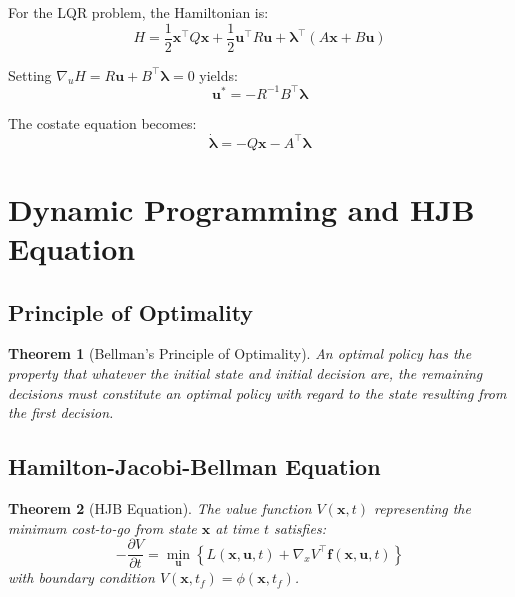 \documentclass[a4paper, 11pt]{article}
\newtheorem{theorem}{Theorem}[section]
\begin{document}
For the LQR problem, the Hamiltonian is:
\begin{equation}
H = \frac{1}{2}\mathbf{x}^\top Q \mathbf{x} + \frac{1}{2}\mathbf{u}^\top R \mathbf{u} + \boldsymbol{\lambda}^\top(A\mathbf{x} + B\mathbf{u})
\end{equation}

Setting $\nabla_u H = R\mathbf{u} + B^\top \boldsymbol{\lambda} = 0$ yields:
\begin{equation}
\mathbf{u}^* = -R^{-1}B^\top \boldsymbol{\lambda}
\end{equation}

The costate equation becomes:
\begin{equation}
\dot{\boldsymbol{\lambda}} = -Q\mathbf{x} - A^\top \boldsymbol{\lambda}
\end{equation}

\section{Dynamic Programming and HJB Equation}

\subsection{Principle of Optimality}

\begin{theorem}[Bellman's Principle of Optimality]
An optimal policy has the property that whatever the initial state and initial decision are,
the remaining decisions must constitute an optimal policy with regard to the state resulting
from the first decision.
\end{theorem}

\subsection{Hamilton-Jacobi-Bellman Equation}

\begin{theorem}[HJB Equation]
The value function $V(\mathbf{x}, t)$ representing the minimum cost-to-go from state $\mathbf{x}$
at time $t$ satisfies:
\begin{equation}
-\frac{\partial V}{\partial t} = \min_\mathbf{u} \left\{ L(\mathbf{x}, \mathbf{u}, t) + \nabla_x V^\top \mathbf{f}(\mathbf{x}, \mathbf{u}, t) \right\}
\end{equation}
with boundary condition $V(\mathbf{x}, t_f) = \phi(\mathbf{x}, t_f)$.
\end{theorem}
\end{document}
